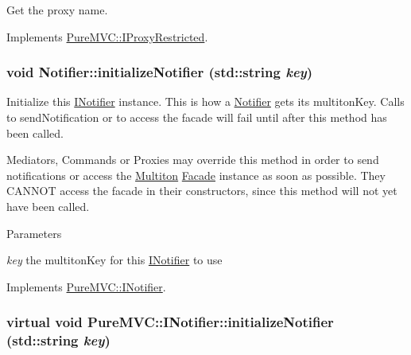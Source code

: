 Get the proxy name. 

Implements \hyperlink{class_pure_m_v_c_1_1_i_proxy_restricted_ae52c8f9de4c2f4a4b90e97006e0b08f9}{PureMVC::IProxyRestricted}.\hypertarget{class_pure_m_v_c_1_1_notifier_a6910365c70415ba7973401215f57e4af}{
\subsubsection[{initializeNotifier}]{\setlength{\rightskip}{0pt plus 5cm}void Notifier::initializeNotifier (std::string {\em key})}}
\label{class_pure_m_v_c_1_1_notifier_a6910365c70415ba7973401215f57e4af}


Initialize this \hyperlink{class_pure_m_v_c_1_1_i_notifier}{INotifier} instance. This is how a \hyperlink{class_pure_m_v_c_1_1_notifier}{Notifier} gets its multitonKey. Calls to sendNotification or to access the facade will fail until after this method has been called.

Mediators, Commands or Proxies may override this method in order to send notifications or access the \hyperlink{class_pure_m_v_c_1_1_multiton}{Multiton} \hyperlink{class_pure_m_v_c_1_1_facade}{Facade} instance as soon as possible. They CANNOT access the facade in their constructors, since this method will not yet have been called.


\begin{DoxyParams}{Parameters}
\item[{\em key}]the multitonKey for this \hyperlink{class_pure_m_v_c_1_1_i_notifier}{INotifier} to use \end{DoxyParams}


Implements \hyperlink{class_pure_m_v_c_1_1_i_notifier_a28d7dbbe0726d4d52080546c5d79b232}{PureMVC::INotifier}.\hypertarget{class_pure_m_v_c_1_1_i_notifier_a28d7dbbe0726d4d52080546c5d79b232}{
\subsubsection[{initializeNotifier}]{\setlength{\rightskip}{0pt plus 5cm}virtual void PureMVC::INotifier::initializeNotifier (std::string {\em key})}}
\label{class_pure_m_v_c_1_1_i_notifier_a28d7dbbe0726d4d52080546c5d79b232}


